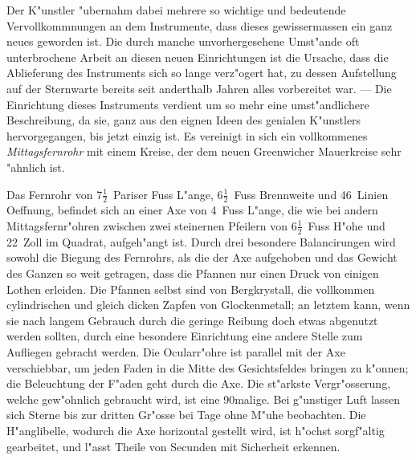 \documentclass[12pt,a4paper]{article}
\begin{document}
Der K"unstler "ubernahm dabei mehrere so wichtige und bedeutende Vervollkommnungen an dem Instrumente,
dass dieses gewissermassen ein ganz neues geworden ist. Die durch manche unvorhergesehene Umst"ande
oft unterbrochene Arbeit an diesen neuen Einrichtungen ist die Ursache, dass die Ablieferung des Instruments
sich so lange verz"ogert hat, zu dessen Aufstellung auf der Sternwarte bereits seit anderthalb Jahren
alles vorbereitet war. --- Die Einrichtung dieses Instruments verdient um so mehr eine umst"andlichere
Beschreibung, da sie, ganz aus den eignen Ideen des genialen K"unstlers hervorgegangen, bis jetzt einzig
ist. Es vereinigt in sich ein vollkommenes \textit{Mittagsfernrohr} mit einem Kreise, der dem neuen Greenwicher
Mauerkreise sehr "ahnlich ist.

Das Fernrohr von $7\frac{1}{2}$~Pariser Fuss L"ange, $6\frac{1}{2}$~Fuss Brennweite und 46~Linien Oeffnung, befindet
sich an einer Axe von 4~Fuss L"ange, die wie bei andern Mittagsfernr"ohren zwischen zwei steinernen
Pfeilern von $6\frac{1}{2}$~Fuss H"ohe und 22~Zoll im Quadrat, aufgeh"angt ist. Durch drei besondere Balancirungen
wird sowohl die Biegung des Fernrohrs, als die der Axe aufgehoben und das Gewicht des Ganzen so weit
getragen, dass die Pfannen nur einen Druck von einigen Lothen erleiden. Die Pfannen selbst sind von
Bergkrystall, die vollkommen cylindrischen und gleich dicken Zapfen von Glockenmetall; an letztem kann,
wenn sie nach langem Gebrauch durch die geringe Reibung doch etwas abgenutzt werden sollten, durch
eine besondere Einrichtung eine andere Stelle zum Aufliegen gebracht werden. Die Ocularr"ohre ist parallel
mit der Axe verschiebbar, um jeden Faden in die Mitte des Gesichtsfeldes bringen zu k"onnen; die Beleuchtung
der F"aden geht durch die Axe. Die st"arkste Vergr"osserung, welche gew"ohnlich gebraucht wird, ist eine
90malige. Bei g"unstiger Luft lassen sich Sterne bis zur dritten Gr"osse bei Tage ohne M"uhe beobachten.
Die H"anglibelle, wodurch die Axe horizontal gestellt wird, ist h"ochst sorgf"altig gearbeitet, und l"asst
Theile von Secunden mit Sicherheit erkennen.
\end{document}
